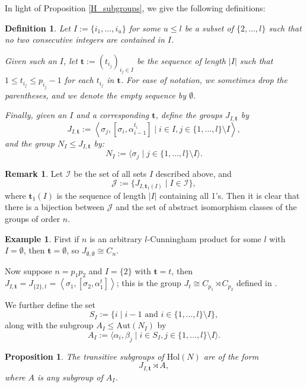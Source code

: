 \documentclass[a4paper,reqno]{amsart}
\newtheorem{proposition}[theorem]{Proposition}
\newtheorem{definition}[theorem]{Definition}
\theoremstyle{definition}
\newtheorem{remark}[theorem]{Remark}
\newtheorem{example}[theorem]{Example}
\newcommand{\bt}{\textbf{t}}
\newcommand{\Aut}{\mathrm{Aut}}
\newcommand{\Hol}{\mathrm{Hol}}
\begin{document}
In light of Proposition \ref{H_subgroups}, we give the following definitions:
\begin{definition}
    Let $I:=\{i_1,\ldots,i_u\}$ for some $u \leq l$ be a subset of $\{2,\ldots,l\}$ such that no two consecutive integers are contained in $I$.

    Given such an $I$, let $\bt:=(t_{i_j})_{i_j \in I}$ be the sequence of length $|I|$ such that $1 \leq t_{i_j} \leq p_{i_j}-1$ for each $t_{i_j}$ in $\bt$. For ease of notation, we sometimes drop the parentheses, and we denote the empty sequence by $\emptyset$.

    Finally, given an $I$ and a corresponding $\bt$, define the groups $J_{I,\bt}$ by
    \[J_{I,\bt}:=\left\langle \sigma_j, \left[\sigma_i,\alpha_{i-1}^{t_i}\right] \mid i \in I, j \in \{1,\ldots,l\}\setminus I \right\rangle,\]
    and the group $N_I \leq J_{I,\bt}$ by:
    \[N_I:=\langle \sigma_j \mid j \in \{1,\ldots,l\} \setminus I \rangle.\]
\end{definition}
\begin{remark}\label{gps_order_n}
    Let $\mathcal{I}$ be the set of all sets $I$ described above, and
    \[\mathcal{J}:=\{J_{I,\bt_1(I)} \mid I \in \mathcal{I}\},\]
    where $\bt_1(I)$ is the sequence of length $|I|$ containing all 1's. Then it is clear that there is a bijection between $\mathcal{J}$ and the set of abstract isomorphism classes of the groups of order $n$.
\end{remark}
\begin{example}\label{subset_examples}
    First if $n$ is an arbitrary $l$-Cunningham product for some $l$ with $I=\emptyset$, then $\bt=\emptyset$, so  $J_{\emptyset,\emptyset}\cong C_n$.
    
    Now suppose $n=p_1p_2$ and $I=\{2\}$ with $\bt=t$, then $J_{I,\bt} = J_{\{2\},t}= \left\langle \sigma_1, \left[\sigma_2,\alpha_1^t\right]\right\rangle$; this is the group $J_t \cong C_{p_1} \rtimes C_{p_2}$ defined in \cite{BML21}.
\end{example}
We further define the set
\[S_I:=\{i \mid i-1 \text{ and } i \in \{1,\ldots,l\}\setminus I\},\]
along with the subgroup $A_I \leq \Aut(N_I)$ by
\[A_I:=\langle \alpha_i,\beta_j \mid i \in S_I, j \in \{1,\ldots,l\} \setminus I \rangle.\]

\begin{proposition}\label{cyclic_trans}
    The transitive subgroups of $\Hol(N)$ are of the form
    \[J_{I,\bt} \rtimes A,\]
    where $A$ is any subgroup of $A_I$.
\end{proposition}
\end{document}
